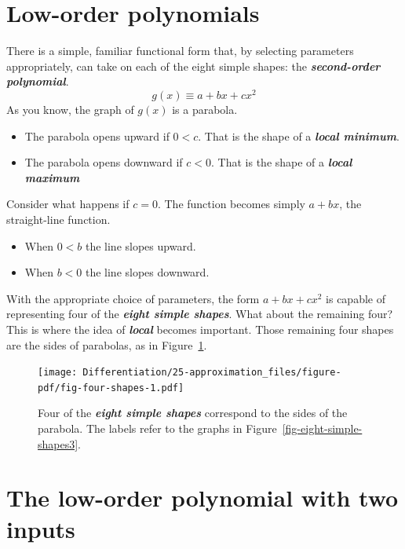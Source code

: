\documentclass[
  letterpaper,
  DIV=11,
  numbers=noendperiod,
  oneside]{scrreprt}
\providecommand{\tightlist}{%
  \setlength{\itemsep}{0pt}\setlength{\parskip}{0pt}}
\begin{document}
\hypertarget{low-order-polynomials}{%
\section{Low-order polynomials}\label{low-order-polynomials}}

There is a simple, familiar functional form that, by selecting
parameters appropriately, can take on each of the eight simple shapes:
the \textbf{\emph{second-order polynomial}}.
\[g(x) \equiv a + b x + c x^2\] As you know, the graph of \(g(x)\) is a
parabola.

\begin{itemize}
\tightlist
\item
  The parabola opens upward if \(0 < c\). That is the shape of a
  \textbf{\emph{local minimum}}.
\item
  The parabola opens downward if \(c < 0\). That is the shape of a
  \textbf{\emph{local maximum}}
\end{itemize}

Consider what happens if \(c = 0\). The function becomes simply
\(a + bx\), the straight-line function.

\begin{itemize}
\tightlist
\item
  When \(0 < b\) the line slopes upward.
\item
  When \(b < 0\) the line slopes downward.
\end{itemize}

With the appropriate choice of parameters, the form \(a + bx + cx^2\) is
capable of representing four of the \textbf{\emph{eight simple shapes}}.
What about the remaining four? This is where the idea of
\textbf{\emph{local}} becomes important. Those remaining four shapes are
the sides of parabolas, as in Figure~\ref{fig-four-shapes}.

\begin{figure}

{\centering \texttt{[image: Differentiation/25-approximation\_files/figure-pdf/fig-four-shapes-1.pdf]}

}

\caption{\label{fig-four-shapes}Four of the \textbf{\emph{eight simple
shapes}} correspond to the sides of the parabola. The labels refer to
the graphs in Figure~\ref{fig-eight-simple-shapes3}.}

\end{figure}

\hypertarget{sec-low-order-two}{%
\section{The low-order polynomial with two
inputs}\label{sec-low-order-two}}
\end{document}
